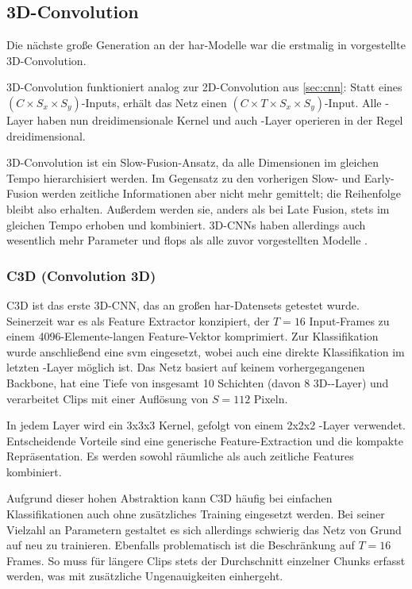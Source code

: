 \subsection{3D-Convolution}
\label{subsec:3d-conv}

Die nächste große Generation an der \gls{har}-Modelle war die erstmalig in \cite{Ji13} vorgestellte 3D-Convolution.

3D-Convolution funktioniert analog zur 2D-Convolution aus \autoref{sec:cnn}:
Statt eines $(C \times S_x \times S_y)$-Inputs, erhält das Netz einen $(C \times T \times S_x \times S_y)$-Input.
Alle \conv-Layer haben nun dreidimensionale Kernel und auch \pool-Layer operieren in der Regel dreidimensional.

3D-Convolution ist ein Slow-Fusion-Ansatz, da alle Dimensionen im gleichen Tempo hierarchisiert werden.
Im Gegensatz zu den vorherigen Slow- und Early-Fusion werden zeitliche Informationen aber nicht mehr gemittelt; die Reihenfolge bleibt also erhalten.
Außerdem werden sie, anders als bei Late Fusion, stets im gleichen Tempo erhoben und kombiniert.
3D-CNNs haben allerdings auch wesentlich mehr Parameter und \gls{flops} als alle zuvor vorgestellten Modelle \cite{Zhu19} \cite{Carreira17}.

\subsubsection*{C3D (Convolution 3D)}

C3D \cite{Tran15} ist das erste 3D-CNN, das an großen \gls{har}-Datensets getestet wurde.
Seinerzeit war es als Feature Extractor konzipiert, der $T=16$ Input-Frames zu einem 4096-Elemente-langen Feature-Vektor komprimiert.
Zur Klassifikation wurde anschließend eine \gls{svm} eingesetzt, wobei auch eine direkte Klassifikation im letzten \fc-Layer möglich ist.
Das Netz basiert auf keinem vorhergegangenen Backbone, hat eine Tiefe von insgesamt 10 Schichten (davon 8 3D-\conv-Layer) und verarbeitet Clips mit einer Auflösung von $S=112$ Pixeln.

In jedem Layer wird ein 3x3x3 Kernel, gefolgt von einem 2x2x2 \pool-Layer verwendet.
Entscheidende Vorteile sind eine generische Feature-Extraction und die kompakte Repräsentation.
Es werden sowohl räumliche als auch zeitliche Features kombiniert.

Aufgrund dieser hohen Abstraktion kann C3D häufig bei einfachen Klassifikationen auch ohne zusätzliches Training eingesetzt werden.
Bei seiner Vielzahl an Parametern gestaltet es sich allerdings schwierig das Netz von Grund auf neu zu trainieren.
Ebenfalls problematisch ist die Beschränkung auf $T=16$ Frames.
So muss für längere Clips stets der Durchschnitt einzelner Chunks erfasst werden, was mit zusätzliche Ungenauigkeiten einhergeht.

